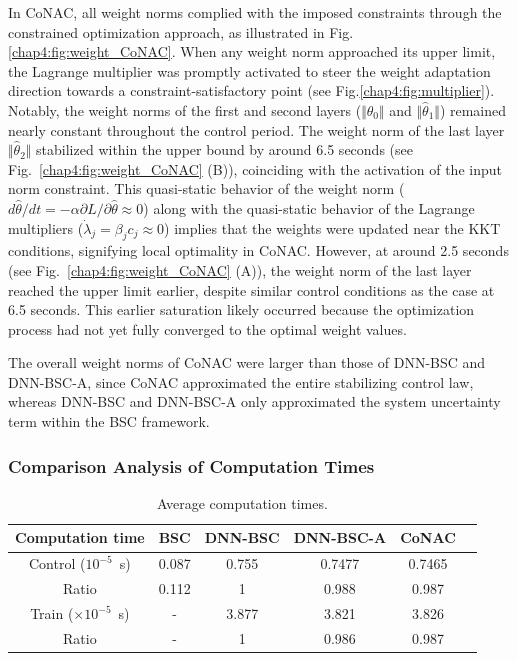 In CoNAC, all weight norms complied with the imposed constraints through the constrained optimization approach, as illustrated in Fig.\ref{chap4:fig:weight_CoNAC}. When any weight norm approached its upper limit, the Lagrange multiplier was promptly activated to steer the weight adaptation direction towards a constraint-satisfactory point (see Fig.\ref{chap4:fig:multiplier}). Notably, the weight norms of the first and second layers ($\Vert {{{\hat \theta }_0}} \Vert$ and $\Vert {{{\hat \theta }_1}} \Vert$) remained nearly constant throughout the control period. The weight norm of the last layer $\Vert {{{\hat \theta }_2}} \Vert$ stabilized within the upper bound by around 6.5 seconds (see Fig.~\ref{chap4:fig:weight_CoNAC} (B)), coinciding with the activation of the input norm constraint. This quasi-static behavior of the weight norm (\ie $d{\hat\theta}/dt=-\alpha\partial L/\partial \hat\theta \approx 0$) along with the quasi-static behavior of the Lagrange multipliers (\ie $\dot\lambda_j = \beta_j c_j \approx 0$) implies that the weights were updated near the KKT conditions, signifying local optimality in CoNAC. However, at around 2.5 seconds (see Fig.~\ref{chap4:fig:weight_CoNAC} (A)), the weight norm of the last layer reached the upper limit earlier, despite similar control conditions as the case at 6.5 seconds. This earlier saturation likely occurred because the optimization process had not yet fully converged to the optimal weight values.

The overall weight norms of CoNAC were larger than those of DNN-BSC and DNN-BSC-A, since CoNAC approximated the entire stabilizing control law, whereas DNN-BSC and DNN-BSC-A only approximated the system uncertainty term within the BSC framework.

\subsubsection{Comparison Analysis of Computation Times}

\begin{table}[!t]
    \renewcommand{\arraystretch}{1.3}
    \caption{Average computation times.}
    \centering
    \begin{tabular}{|c||c|c|c|c|c|}
    \hline
    Computation time & \textbf{BSC} & \textbf{DNN-BSC} & \textbf{DNN-BSC-A} & \textbf{CoNAC} \\
    \hline 
    Control ($10^{-5}$~s) & 0.087 & 0.755 & 0.7477 & 0.7465 \\
    \hline
    Ratio & 0.112 & 1 & 0.988 & 0.987 \\
    \hline
    Train ($\times 10^{-5}$~s) & - & 3.877 & 3.821 & 3.826 \\
    \hline
    Ratio & - & 1 & 0.986 & 0.987 \\ 
    \hline
    \end{tabular}
    \label{chap4:table:comp_time}
\end{table}

